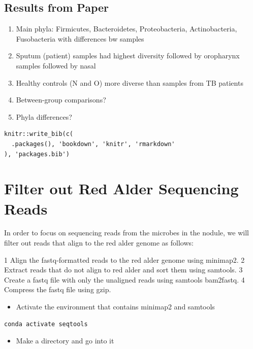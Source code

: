 \documentclass[
]{book}
\providecommand{\tightlist}{%
  \setlength{\itemsep}{0pt}\setlength{\parskip}{0pt}}
\begin{document}
\hypertarget{results-from-paper}{%
\section{Results from Paper}\label{results-from-paper}}

\begin{enumerate}
\def\labelenumi{\arabic{enumi}.}
\tightlist
\item
  Main phyla: Firmicutes, Bacteroidetes, Proteobacteria, Actinobacteria, Fusobacteria with differences bw samples
\item
  Sputum (patient) samples had highest diversity followed by oropharynx samples followed by nasal
\item
  Healthy controls (N and O) more diverse than samples from TB patients
\item
  Between-group comparisons?
\item
  Phyla differences?
\end{enumerate}

\begin{verbatim}
knitr::write_bib(c(
  .packages(), 'bookdown', 'knitr', 'rmarkdown'
), 'packages.bib')
\end{verbatim}

\hypertarget{filter-out-red-alder-sequencing-reads}{%
\chapter{Filter out Red Alder Sequencing Reads}\label{filter-out-red-alder-sequencing-reads}}

In order to focus on sequencing reads from the microbes in the nodule, we will filter out reads that align to the red alder genome as follows:

1 Align the fastq-formatted reads to the red alder genome using minimap2.
2 Extract reads that do not align to red alder and sort them using samtools.
3 Create a fastq file with only the unaligned reads using samtools bam2fastq.
4 Compress the fastq file using gzip.

\begin{itemize}
\tightlist
\item
  Activate the environment that contains minimap2 and samtools
\end{itemize}

\begin{verbatim}
conda activate seqtools
\end{verbatim}

\begin{itemize}
\tightlist
\item
  Make a directory and go into it
\end{itemize}
\end{document}
